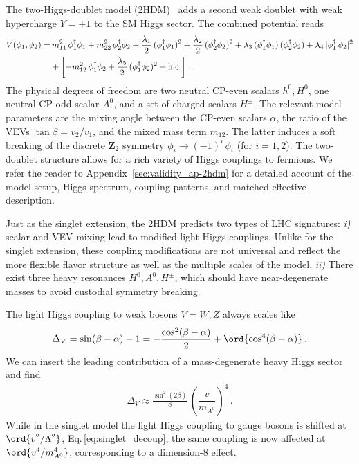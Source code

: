 The two-Higgs-doublet model (2HDM)~\cite{2hdm_review} adds a second
weak doublet with weak hypercharge $Y = +1$ to the SM Higgs sector.
The combined potential reads
%
\begin{alignat}{5} V(\phi_1,\phi_2) =& \,
m^2_{11}\,\phi_1^\dagger\phi_1 + m^2_{22}\,\phi_2^\dagger\phi_2 +
\frac{\lambda_1}{2} \, (\phi_1^\dagger\phi_1)^2 + \frac{\lambda_2}{2}
\, (\phi_2^\dagger\phi_2)^2 + \lambda_3 \,
(\phi_1^\dagger\phi_1)\,(\phi_2^\dagger\phi_2) + \lambda_4 \,
|\phi_1^\dagger\,\phi_2|^2 \notag \\ & + \left[ -
m^2_{12}\,\phi_1^\dagger\phi_2 + \frac{\lambda_5}{2} \,
(\phi_1^\dagger\phi_2)^2 + \text{h.c.}  \right] \,.
\label{eq:2hdmpotential}
\end{alignat}
%
The physical degrees of freedom are two neutral CP-even scalars
$h^0,H^0$, one neutral CP-odd scalar $A^0$, and a set of charged
scalars $H^\pm$. The relevant model parameters are the mixing angle
between the CP-even scalars $\alpha$, the ratio of the VEVs $\tan
\beta = v_2/v_1$, and the mixed mass term $m_{12}$. The latter induces
a soft breaking of the discrete $\mathbf{Z}_2$ symmetry $\phi_i \to
(-1)^{i}\,\phi_i$ (for $i=1,2$).  The two-doublet structure allows for
a rich variety of Higgs couplings to fermions.  We refer the reader to
Appendix~\ref{sec:validity_ap-2hdm} for a detailed account of the model setup,
Higgs spectrum, coupling patterns, and matched effective
description.\medskip

Just as the singlet extension, the 2HDM predicts two types of LHC
signatures: \textit{i)} scalar and VEV mixing lead to modified light
Higgs couplings. Unlike for the singlet extension, these coupling
modifications are not universal and reflect the more flexible flavor
structure as well as the multiple scales of the model. \textit{ii)}
There exist three heavy resonances $H^0, A^0, H^\pm$, which should
have near-degenerate masses to avoid custodial symmetry breaking.
\medskip

The light Higgs coupling to weak bosons $V=W,Z$ always scales like
%
\begin{align} \Delta_V = \sin (\beta - \alpha) - 1 = - \frac{
\cos^2(\beta - \alpha)}{2} + \ord {\cos^4(\beta - \alpha) } \,.
\label{eq:2hdm_shift}
\end{align}
%
We can insert the leading contribution of a mass-degenerate heavy
Higgs sector and find
%
\begin{align} \Delta_V \approx \frac{\sin^2 (2\beta)}{8} \, \left(
\dfrac{v}{m_{A^0}} \right)^4 \,.
\label{eq:2hdm_decoup}
\end{align}
%
While in the singlet model the light Higgs coupling to gauge bosons is
shifted at $\ord {v^2/\Lambda^2}$, Eq.\,\eqref{eq:singlet_decoup}, the
same coupling is now affected at $\ord{v^4/m_{A^0}^4}$, corresponding
to a dimension-8 effect.

